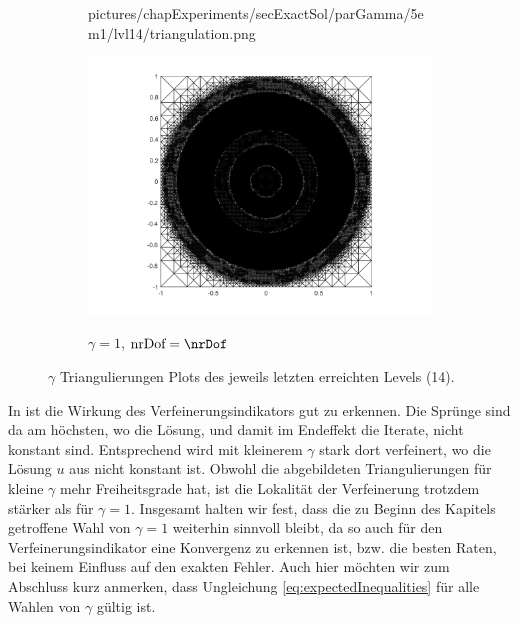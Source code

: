 \begin{figure}[p]
\begin{subfigure}{.32\linewidth}
      {pictures/chapExperiments/secExactSol/parGamma/5em1/lvl14/triangulation.png}
    \label{fig:gammaDot5Triang}
  \end{subfigure}
  \begin{subfigure}{.32\linewidth}
    \centering
    \caption{$\gamma=1$, $\text{nrDof}=\nrDof$}
    \includegraphics[trim = 100 30 80 20, clip, width=\linewidth]
      {pictures/chapExperiments/secExactSol/parGamma/1/lvl14/triangulation.png}
    \label{fig:gamma1Triang}
  \end{subfigure}
  \caption{$\gamma$ Triangulierungen Plots des jeweils letzten erreichten 
  Levels (14).}
  \label{fig:gammaTriangs}
\end{figure}
In  ist die Wirkung des Verfeinerungsindikators gut zu
erkennen. 
Die Sprünge sind da am höchsten, wo die Lösung, und damit im Endeffekt die
Iterate, nicht konstant sind.   
Entsprechend wird mit kleinerem $\gamma$ stark dort verfeinert, wo die Lösung
$u$ aus  nicht konstant ist.
Obwohl die abgebildeten Triangulierungen für kleine $\gamma$ mehr 
Freiheitsgrade hat, ist die Lokalität der Verfeinerung trotzdem stärker
als für $\gamma=1$.
Insgesamt halten wir fest, dass die zu Beginn des Kapitels getroffene Wahl
von $\gamma=1$ weiterhin sinnvoll bleibt, da so auch für den
Verfeinerungsindikator eine Konvergenz zu erkennen ist, bzw. die besten
Raten, bei keinem Einfluss auf den exakten Fehler.
Auch hier möchten wir zum Abschluss kurz anmerken, dass Ungleichung
\eqref{eq:expectedInequalities} für alle Wahlen von $\gamma$ gültig ist.

